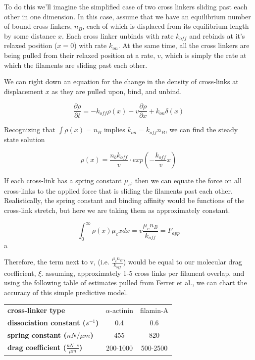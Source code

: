 \documentclass[pre,reprint]{revtex4-1}
\begin{document}
To do this we'll imagine the simplified case of two cross linkers sliding past each other in one dimension.  In this case, assume that we have an equilibrium number of bound cross-linkers, $n_B$, each of which is displaced from its equilibrium length by some distance $x$.  Each cross linker unbinds with rate $k_{off}$ and rebinds at it's relaxed position ($x=0$) with rate $k_{on}$.  At the same time, all the cross linkers are being pulled from their relaxed position at a rate, $v$, which is simply the rate at which the filaments are sliding past each other.  

We can right down an equation for the change in the density of cross-links at displacement $x$ as they are pulled upon, bind, and unbind.

\begin{equation}
\frac{\partial \rho}{\partial t} = -k_{off}\rho(x) - v\frac{\partial \rho}{\partial x} + k_{on}\delta(x)
\end{equation}

Recognizing that $\int \rho(x)=n_B$ implies $k_{on}=k_{off}n_B$, we can find the steady state solution

\begin{equation}
\rho(x) = \frac{n_b k_{off}}{v}\cdot exp\left ( -\frac{k_{off}}{v}x \right )
\end{equation}

If each cross-link has a spring constant $\mu_c$, then we can equate the force on all cross-links to the applied force that is sliding the filaments past each other.  Realistically, the spring constant and binding affinity would be functions of the cross-link stretch, but here we are taking them as approximately constant.  

\begin{equation}
\int_{0}^{\infty}\rho(x)\mu_cx dx = v \frac{\mu_c n_B}{k_{off}}= F_{app}
\end{equation}a

Therefore, the term next to v, (i.e. $\tfrac{\mu_c n_B}{k_{off}}$) would be equal to our molecular drag coefficient, $\xi$.  assuming, approximately 1-5 cross links per filament overlap, and using the following table of estimates pulled from Ferrer et al., we can chart the accuracy of this simple predictive model.

\begin{table}[h]
\begin{tabular}{| l | c | c |}
\hline
\textbf{cross-linker type} & $\alpha$-actinin & filamin-A  \\ \cline{1-1}
\textbf{dissociation constant ($s^{-1}$)} & 0.4 & 0.6 \\ \cline{1-1}
\textbf{spring constant ($nN / \mu m$)} & 455 & 820 \\ \cline{1-1}
\textbf{drag coefficient ($\tfrac{nN \cdot s}{\mu m}$)} & 200-1000 & 500-2500 \\ 
\hline
\end{tabular}
\end{table}
\end{document}
